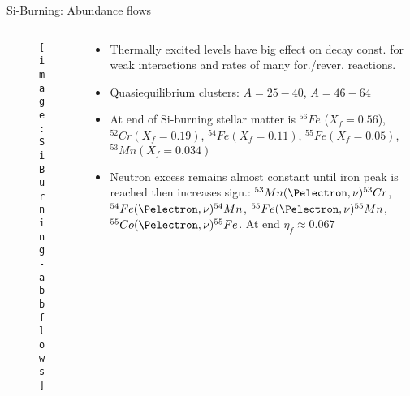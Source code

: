 \begin{frame}{Si-Burning: Abundance flows}
    \begin{columns}[T]
        \begin{column}{0.4\textwidth}
\begin{figure}[!ht]
    \texttt{[image: SiBurning-abbflows ]}\label{fig:SiBurning-abbflows }
\end{figure}
        \end{column}
        \begin{column}{0.6\textwidth}
            \begin{itemize}
                \item Thermally excited levels have big effect on decay const. for weak interactions and rates of many for./rever. reactions.
                \item Quasiequilibrium clusters: $A=25-40$, $A=46-64$
                \item At end of Si-burning stellar matter is $^{56}Fe$ ($X_f=0.56$), $^{52}Cr(X_f=0.19)$, $^{54}Fe(X_f=0.11)$, $^{55}Fe(X_f=0.05)$, $^{53}Mn(X_f=0.034)$
                \item Neutron excess remains almost constant until iron peak is reached then increases sign.: $^{53}Mn(\Pelectron,\nu)^{53}Cr$, $^{54}Fe(\Pelectron,\nu)^{54}Mn$, $^{55}Fe(\Pelectron,\nu)^{55}Mn$, $^{55}Co(\Pelectron,\nu)^{55}Fe$. At end $\eta_f\approx0.067$
            \end{itemize}
        \end{column}
    \end{columns}
\end{frame}


